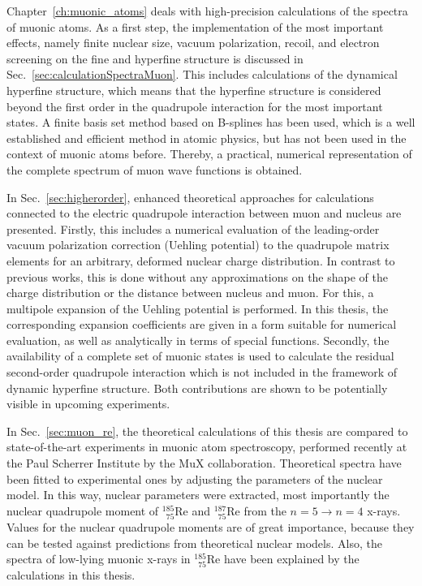 Chapter~\ref{ch:muonic_atoms} deals with high-precision calculations of the spectra of muonic atoms. 
As a first step, the implementation of the most important effects, namely finite nuclear size, vacuum polarization, recoil, and electron screening on the fine and hyperfine structure is discussed in Sec.~\ref{sec:calculationSpectraMuon}.
This includes calculations of the dynamical hyperfine structure, which means that the hyperfine structure is considered beyond the first order in the quadrupole interaction for the most important states.
A finite basis set method based on B-splines has been used, which is a well established and efficient method in atomic physics, but has not been used in the context of muonic atoms before. Thereby, a practical, numerical representation of the complete spectrum of muon wave functions is obtained.

In Sec.~\ref{sec:higherorder}, enhanced theoretical approaches for calculations connected to the electric quadrupole interaction between muon and nucleus are presented. 
Firstly, this includes a numerical evaluation of the leading-order vacuum polarization correction (Uehling potential) to the quadrupole matrix elements for an arbitrary, deformed nuclear charge distribution. In contrast to previous works, this is done without any approximations on the shape of the charge distribution or the distance between nucleus and muon. For this, a multipole expansion of the Uehling potential is performed. In this thesis, the corresponding expansion coefficients are given in a form suitable for numerical evaluation, as well as analytically in terms of special functions.
Secondly, the availability of a complete set of muonic states is used to calculate the residual second-order quadrupole interaction which is not included in the framework of dynamic hyperfine structure. 
Both contributions are shown to be potentially visible in upcoming experiments.

In Sec.~\ref{sec:muon_re}, the theoretical calculations of this thesis are compared to state-of-the-art experiments in muonic atom spectroscopy, performed recently at the Paul Scherrer Institute by the MuX collaboration. Theoretical spectra have been fitted to experimental ones by adjusting the parameters of the nuclear model. In this way, nuclear parameters were extracted, most importantly the nuclear quadrupole moment of $_{\phantom{1}75}^{185}$Re and $_{\phantom{1}75}^{187}$Re from the ${n}{=}{5}\rightarrow {n}{=}{4}$ x-rays. Values for the nuclear quadrupole moments are of great importance, because they can be tested against predictions from theoretical nuclear models. 
Also, the spectra of low-lying muonic x-rays in $_{\phantom{1}75}^{185}$Re have been explained by the calculations in this thesis.

